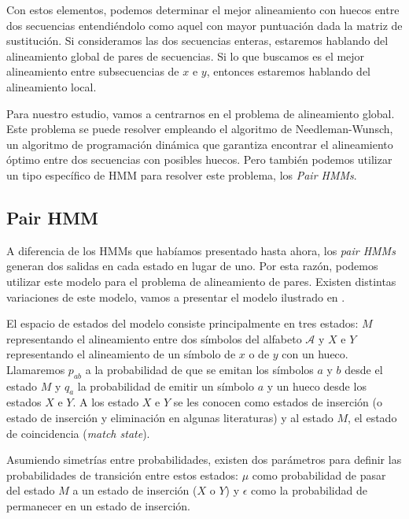 Con estos elementos, podemos determinar el mejor alineamiento con huecos entre dos secuencias entendiéndolo como aquel con mayor puntuación dada la matriz de sustitución. Si consideramos las dos secuencias enteras, estaremos hablando del alineamiento global de pares de secuencias. Si lo que buscamos es el mejor alineamiento entre subsecuencias de $x$ e $y$, entonces estaremos hablando del alineamiento local.

Para nuestro estudio, vamos a centrarnos en el problema de alineamiento global. Este problema se puede resolver empleando el algoritmo de Needleman-Wunsch, un algoritmo de programación dinámica que garantiza encontrar el alineamiento óptimo entre dos secuencias con posibles huecos. Pero también podemos utilizar un tipo específico de HMM para resolver este problema, los \textit{Pair HMMs}.

\subsection{Pair HMM}
A diferencia de los HMMs que habíamos presentado hasta ahora, los \textit{pair HMMs} generan dos salidas en cada estado en lugar de uno. Por esta razón, podemos utilizar este modelo para el problema de alineamiento de pares. Existen distintas variaciones de este modelo, vamos a presentar el modelo ilustrado en \cite{Durbin}.


El espacio de estados del modelo consiste principalmente en tres estados: $M$ representando el alineamiento entre dos símbolos del alfabeto $\mathcal{A}$ y $X$ e $Y$ representando el alineamiento de un símbolo de $x$ o de $y$ con un hueco. Llamaremos $p_{ab}$ a la probabilidad de que se emitan los símbolos $a$ y $b$ desde el estado $M$ y $q_{a}$ la probabilidad de emitir un símbolo $a$ y un hueco desde los estados $X$ e $Y$. A los estado $X$ e $Y$ se les conocen como estados de inserción (o estado de inserción y eliminación en algunas literaturas) y al estado $M$, el estado de coincidencia (\textit{match state}).

Asumiendo simetrías entre probabilidades, existen dos parámetros para definir las probabilidades de transición entre estos estados: $\mu$ como probabilidad de pasar del estado $M$ a un estado de inserción ($X$ o $Y$) y $\epsilon$ como la probabilidad de permanecer en un estado de inserción.
